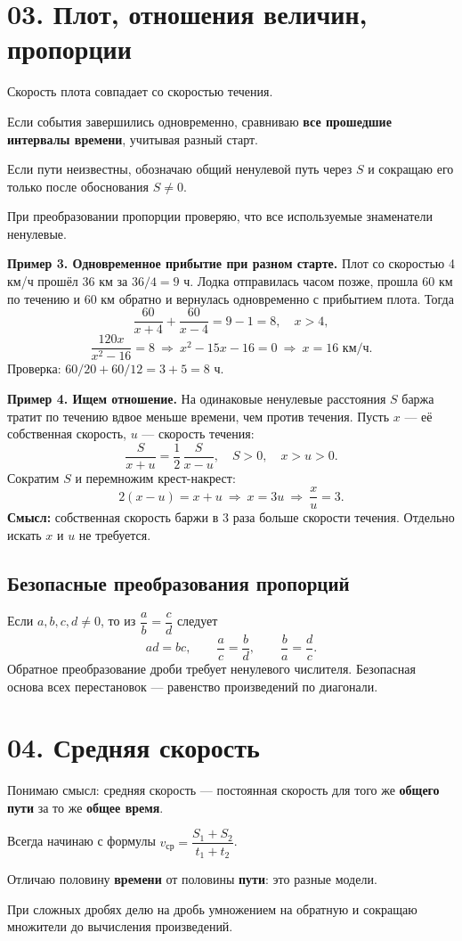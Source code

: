 \documentclass[a4paper,12pt]{article}
\newcommand{\key}[1]{\textcolor{darkaccent}{\bfseries #1}}
\newcommand{\ruleline}{\par\vspace{.15em}{\color{accent!65}\hrule height .6pt}\vspace{.65em}}
\newcommand{\checks}[1]{\item[$\square$] #1}
\begin{document}
\clearpage
\section*{03. Плот, отношения величин, пропорции}
\ruleline
\begin{checklist}
\checks{Скорость плота совпадает со скоростью течения.}
\checks{Если события завершились одновременно, сравниваю \textbf{все прошедшие интервалы времени}, учитывая разный старт.}
\checks{Если пути неизвестны, обозначаю общий ненулевой путь через $S$ и сокращаю его только после обоснования $S\ne0$.}
\checks{При преобразовании пропорции проверяю, что все используемые знаменатели ненулевые.}
\end{checklist}

\key{Пример 3. Одновременное прибытие при разном старте.} Плот со скоростью 4 км/ч прошёл 36 км за $36/4=9$ ч. Лодка отправилась часом позже, прошла 60 км по течению и 60 км обратно и вернулась одновременно с прибытием плота. Тогда
\[
 \frac{60}{x+4}+\frac{60}{x-4}=9-1=8,\quad x>4,
\]
\[
 \frac{120x}{x^2-16}=8\ \Longrightarrow\
 x^2-15x-16=0\ \Longrightarrow\ \boxed{x=16\text{ км/ч}}.
\]
Проверка: $60/20+60/12=3+5=8$ ч.

\key{Пример 4. Ищем отношение.} На одинаковые ненулевые расстояния $S$ баржа тратит по течению вдвое меньше времени, чем против течения. Пусть $x$ --- её собственная скорость, $u$ --- скорость течения:
\[
 \frac{S}{x+u}=\frac12\,\frac{S}{x-u},\quad
 S>0,\quad x>u>0.
\]
Сократим $S$ и перемножим крест-накрест:
\[
 2(x-u)=x+u\ \Longrightarrow\ x=3u
 \ \Longrightarrow\ \boxed{\frac{x}{u}=3}.
\]
\key{Смысл:} собственная скорость баржи в 3 раза больше скорости течения. Отдельно искать $x$ и $u$ не требуется.

\subsection*{Безопасные преобразования пропорций}
Если $a,b,c,d\ne0$, то из $\dfrac ab=\dfrac cd$ следует
\[
 ad=bc,\qquad \frac ac=\frac bd,\qquad
 \frac ba=\frac dc.
\]
Обратное преобразование дроби требует ненулевого числителя. Безопасная основа всех перестановок --- равенство произведений по диагонали.

\section*{04. Средняя скорость}
\ruleline
\begin{checklist}
\checks{Понимаю смысл: средняя скорость --- постоянная скорость для того же \textbf{общего пути} за то же \textbf{общее время}.}
\checks{Всегда начинаю с формулы $v_{\text{ср}}=\dfrac{S_1+S_2}{t_1+t_2}$.}
\checks{Отличаю половину \textbf{времени} от половины \textbf{пути}: это разные модели.}
\checks{При сложных дробях делю на дробь умножением на обратную и сокращаю множители до вычисления произведений.}
\end{checklist}
\end{document}

